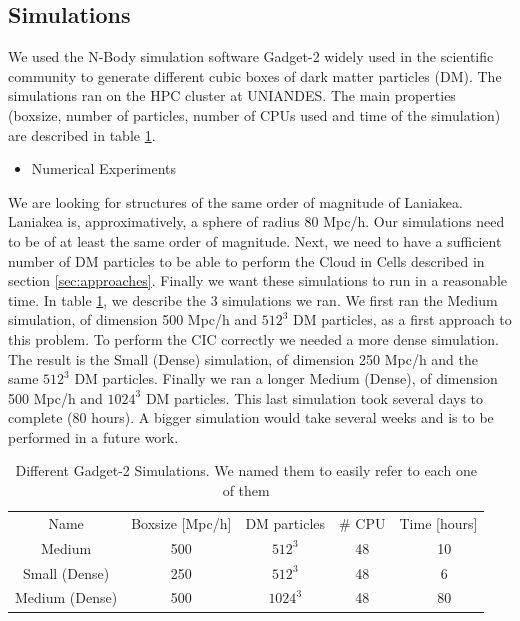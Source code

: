 \documentclass[12pt]{article}
\begin{document}
\subsection{Simulations}\label{sec:sims}
\begin{par}
We used the N-Body simulation software Gadget-2
 \cite{springel_gadget_2_2005}
widely used in the scientific community to
 generate different cubic boxes of dark matter
  particles
  (DM). The simulations ran on the HPC cluster at
   UNIANDES.
  The main properties (boxsize, number of
   particles, number of CPUs used and time of the
    simulation) are described in table
     \ref{tab:sims}. \\
\end{par}
\begin{itemize}
\item Numerical Experiments
\end{itemize}
\begin{par}
We are looking for structures of the same order of
 magnitude of Laniakea. Laniakea is, approximatively, a
  sphere of radius 80 Mpc/h. Our simulations need to be
   of at least the same order of magnitude. Next, we
    need to have a sufficient number of DM particles to
     be able to perform the Cloud in Cells described in
      section \ref{sec:approaches}. Finally we want
       these simulations to run in a reasonable time. 
       In table \ref{tab:sims}, we describe the 3
        simulations we ran. We first ran the Medium
         simulation, of dimension 500 Mpc/h and $512^3$
          DM particles, as a first approach to this
           problem. To perform the CIC correctly we
            needed a more dense simulation. The result
             is the Small (Dense) simulation, of
              dimension 250 Mpc/h and the same $512^3$
               DM particles. Finally we ran a longer
                Medium (Dense), of dimension 500 Mpc/h
                 and  $1024^3$ DM particles. This last
                  simulation took several days to
                   complete (80 hours). A bigger
                    simulation would take several weeks
                     and is to be performed in a future
                      work.
\end{par}
\begin{table}[ht]
    \centering
    \begin{tabular}{|c|c|c|c|c|}
        Name & Boxsize [Mpc/h] & DM particles & \# CPU & Time [hours] \\
        Medium & 500 & $512^{3}$ & 48 & ~ 10 \\
        Small (Dense) & 250 & $512^{3}$ & 48 & ~ 6  \\
        Medium (Dense) & 500 & $1024^{3}$ & 48 & ~ 80\\
    \end{tabular}
    \caption{Different Gadget-2 Simulations. We named them to easily refer to each one of them}
    \label{tab:sims}
\end{table}
\FloatBarrier
\end{document}
